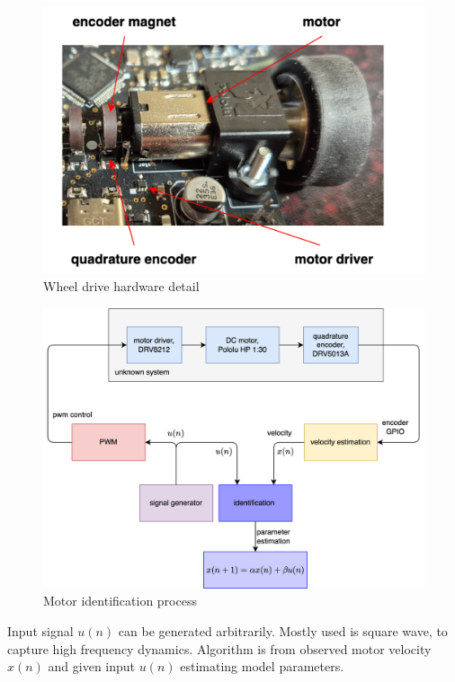 \documentclass[12pt,twoside,onecolumn,openany,extrafontsizes,dvipsnames]{memoir}
\begin{document}
        \begin{figure}[!htb]
            \centering
            \includegraphics[scale=0.8]{../diagrams/control_generic/control_generic-motor_control_photo.png}
            \caption{Wheel drive hardware detail}
            \label{fig:wheel_drive_detail}
        \end{figure}

        \begin{figure}[!htb]
            \centering
            \includegraphics[scale=0.6]{../diagrams/identification/identification.png}
            \caption{Motor identification process}
            \label{fig:motor_identification_process}
        \end{figure}

        Input signal $u(n)$ can be generated arbitrarily. Mostly used is square wave, to capture
        high frequency dynamics. Algorithm is from observed motor velocity $x(n)$ and given input $u(n)$
        estimating model parameters.
\end{document}
